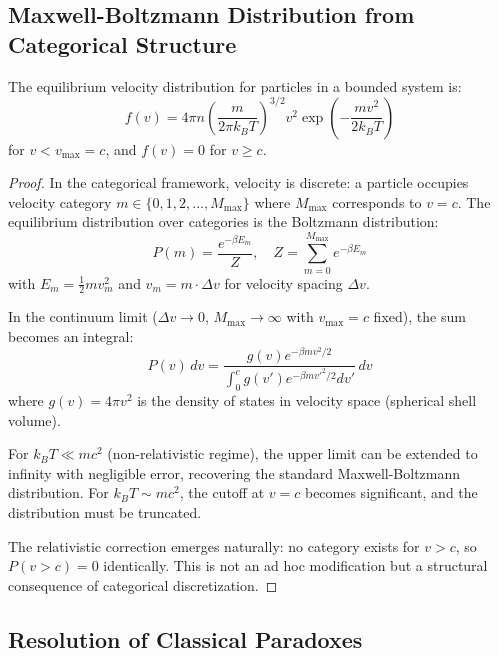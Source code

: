 \subsection{Maxwell-Boltzmann Distribution from Categorical Structure}

\begin{theorem}
\label{thm:maxwell_boltzmann}
The equilibrium velocity distribution for particles in a bounded system is:
\begin{equation}
f(v) = 4\pi n \left(\frac{m}{2\pi k_B T}\right)^{3/2} v^2 \exp\left(-\frac{mv^2}{2k_BT}\right)
\label{eq:maxwell_boltzmann}
\end{equation}
for $v < v_{\max} = c$, and $f(v) = 0$ for $v \geq c$.
\end{theorem}

\begin{proof}
In the categorical framework, velocity is discrete: a particle occupies velocity category $m \in \{0, 1, 2, \ldots, M_{\max}\}$ where $M_{\max}$ corresponds to $v = c$. The equilibrium distribution over categories is the Boltzmann distribution:
\begin{equation}
P(m) = \frac{e^{-\beta E_m}}{Z}, \quad Z = \sum_{m=0}^{M_{\max}} e^{-\beta E_m}
\end{equation}
with $E_m = \frac{1}{2}m v_m^2$ and $v_m = m \cdot \Delta v$ for velocity spacing $\Delta v$.

In the continuum limit ($\Delta v \to 0$, $M_{\max} \to \infty$ with $v_{\max} = c$ fixed), the sum becomes an integral:
\begin{equation}
P(v) \, dv = \frac{g(v) e^{-\beta mv^2/2}}{\int_0^c g(v') e^{-\beta mv'^2/2} dv'} \, dv
\end{equation}
where $g(v) = 4\pi v^2$ is the density of states in velocity space (spherical shell volume).

For $k_BT \ll mc^2$ (non-relativistic regime), the upper limit can be extended to infinity with negligible error, recovering the standard Maxwell-Boltzmann distribution. For $k_BT \sim mc^2$, the cutoff at $v = c$ becomes significant, and the distribution must be truncated.

The relativistic correction emerges naturally: no category exists for $v > c$, so $P(v > c) = 0$ identically. This is not an ad hoc modification but a structural consequence of categorical discretization.
\end{proof}

\subsection{Resolution of Classical Paradoxes}

